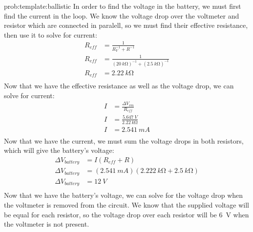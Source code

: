 \begin{solution}{prob:template:ballistic}\label{soln:template:ballistic}
	In order to find the voltage in the battery, we must first find the current in the loop. We know the voltage drop over the voltmeter and resistor which are connected in paralell, so we must find their effective resistance, then use it to solve for current:
	\begin{align*}
	R_{eff} &= \frac{1}{R_V^{-1}+R^{-1}}\\
	R_{eff} &= \frac{1}{(\SI{20}{k\ohm})^{-1}+(\SI{2.5}{k\ohm})^{-1}}\\
	R_{eff} &= \SI{2.22}{k\ohm}\\
	\end{align*}
	Now that we have the effective resistance as well as the voltage drop, we can solve for current:
	\begin{align*}
	I &= \frac{\Delta V_{vm}}{R_{eff}}\\
	I &= \frac{\SI{5.647}{V}}{\SI{2.22}{k\ohm}}\\
	I &= \SI{2.541}{mA}\\
	\end{align*}
	Now that we have the current, we must sum the voltage drops in both resistors, which will give the battery's voltage:
	\begin{align*}
	\Delta V_{battery} &= I(R_{eff}+R)\\
	\Delta V_{battery} &= (\SI{2.541}{mA})(\SI{2.222}{k\ohm}+\SI{2.5}{k\ohm})\\
	\Delta V_{battery} &= \SI{12}{V}\\
	\end{align*}
	Now that we have the battery's voltage, we can solve for the voltage drop when the voltmeter is removed from the circuit. We know that the supplied voltage will be equal for each resistor, so the voltage drop over each resistor will be \SI{6}{V} when the voltmeter is not present.
\end{solution}

